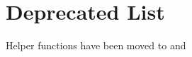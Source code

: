 \chapter{Deprecated List}
\hypertarget{deprecated}{}\label{deprecated}

\begin{DoxyRefList}
\item[File \doxylink{helpers_8cpp}{helpers.cpp} ]\label{deprecated__deprecated000001}%
%
Helper functions have been moved to  and  
\end{DoxyRefList}